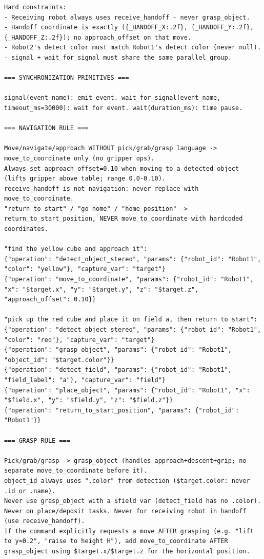 \begin{lstlisting}[caption={The few-shot and rule-based system prompt for the command parser.}, extendedchars=true]
Hard constraints:
- Receiving robot always uses receive_handoff - never grasp_object.
- Handoff coordinate is exactly ({_HANDOFF_X:.2f}, {_HANDOFF_Y:.2f}, {_HANDOFF_Z:.2f}); no approach_offset on that move.
- Robot2's detect color must match Robot1's detect color (never null).
- signal + wait_for_signal must share the same parallel_group.

=== SYNCHRONIZATION PRIMITIVES ===

signal(event_name): emit event. wait_for_signal(event_name, timeout_ms=30000): wait for event. wait(duration_ms): time pause.

=== NAVIGATION RULE ===

Move/navigate/approach WITHOUT pick/grab/grasp language -> move_to_coordinate only (no gripper ops).
Always set approach_offset=0.10 when moving to a detected object (lifts gripper above table; range 0.0-0.10).
receive_handoff is not navigation: never replace with move_to_coordinate.
"return to start" / "go home" / "home position" -> return_to_start_position, NEVER move_to_coordinate with hardcoded coordinates.

"find the yellow cube and approach it":
{"operation": "detect_object_stereo", "params": {"robot_id": "Robot1", "color": "yellow"}, "capture_var": "target"}
{"operation": "move_to_coordinate", "params": {"robot_id": "Robot1", "x": "$target.x", "y": "$target.y", "z": "$target.z", "approach_offset": 0.10}}

"pick up the red cube and place it on field a, then return to start":
{"operation": "detect_object_stereo", "params": {"robot_id": "Robot1", "color": "red"}, "capture_var": "target"}
{"operation": "grasp_object", "params": {"robot_id": "Robot1", "object_id": "$target.color"}}
{"operation": "detect_field", "params": {"robot_id": "Robot1", "field_label": "a"}, "capture_var": "field"}
{"operation": "place_object", "params": {"robot_id": "Robot1", "x": "$field.x", "y": "$field.y", "z": "$field.z"}}
{"operation": "return_to_start_position", "params": {"robot_id": "Robot1"}}

=== GRASP RULE ===

Pick/grab/grasp -> grasp_object (handles approach+descent+grip; no separate move_to_coordinate before it).
object_id always uses ".color" from detection ($target.color: never .id or .name).
Never use grasp_object with a $field var (detect_field has no .color). Never on place/deposit tasks. Never for receiving robot in handoff (use receive_handoff).
If the command explicitly requests a move AFTER grasping (e.g. "lift to y=0.2", "raise to height H"), add move_to_coordinate AFTER grasp_object using $target.x/$target.z for the horizontal position.


\end{lstlisting}
